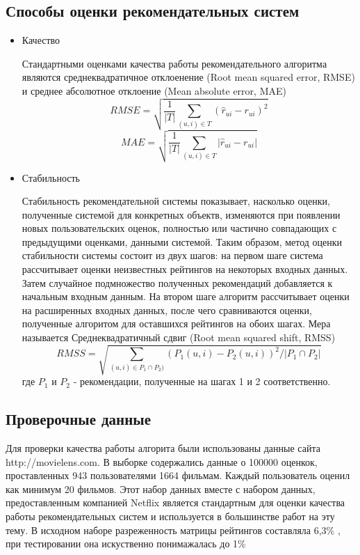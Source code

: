 \documentclass[12pt]{article} %
\begin{document}
\subsection{Способы оценки рекомендательных систем}
\begin{itemize}
\item  Качество 
\par Стандартными оценками качества работы рекомендательного алгоритма являются среднеквадратичное отклоенение (Root mean squared error, RMSE) и среднее абсолютное отклоение (Mean absolute error, MAE)
\[
	RMSE=\sqrt{\frac{1}{|T|}\sum_{(u,i)\in T} (\hat{r}_{ui} - r_{ui})^2}
\]
\[	
	MAE=\sqrt{\frac{1}{|T|}\sum_{(u,i)\in T} |\hat{r}_{ui} - r_{ui}|}
\]
\item Стабильность
\par Стабильность рекомендательной системы показывает, насколько оценки, полученные системой для конкретных объектв, изменяются при появлении новых пользовательских оценок, полностью или частично совпадающих с предыдущими оценками, данными системой. Таким образом, метод оценки стабильности системы состоит из двух шагов: на первом %
шаге система рассчитывает оценки неизвестных рейтингов на некоторых входных данных. Затем случайное подмножество полученных рекомендаций добавляется к начальным входным данным. На втором шаге алгоритм рассчитывает оценки на расширенных входных данных, после чего сравниваются оценки, полученные алгоритом для оставшихся рейтингов на обоих шагах. Мера называется Среднеквадратичный сдвиг (Root mean squared shift, RMSS)
\[
	RMSS=\sqrt{\sum_{(u,i) \in P_{1} \cap P_{2})} (P_{1}(u,i) - P_{2}(u,i))^2 /  |P_{1} \cap P_{2}|}
\]  
где $P_{1}$ и $P_{2}$ - рекомендации, полученные на шагах 1 и 2 соответственно.
\end{itemize}
\subsection{Проверочные данные}
Для проверки качества работы алгорита были использованы данные сайта http://movielens.com. В выборке содержались данные о 100000 оценкок, проставленных  943 пользователями 
1664 фильмам. Каждый пользователь оценил как минимум 20 фильмов. Этот набор данных вместе с набором данных, предоставленным компанией Netflix является стандартным для оценки качества работы рекомендательных систем и используется в большинстве работ на эту тему.
В исходном наборе разреженность матрицы рейтингов составляла 6,3\% , при тестировании она искуственно понимажалась до 1\%
\end{document}
